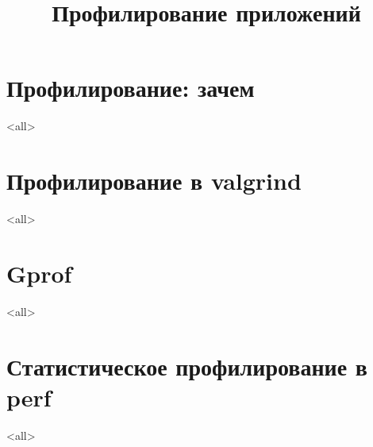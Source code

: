 

\title[Profiling]{Профилирование приложений}





\begin{frame}
	\frametitle{}
	\titlepage
	\vspace{-0.5cm}
	\begin{center}
	\end{center}
\end{frame}

\begin{frame}
	\tableofcontents
\end{frame}




\section{Профилирование: зачем}
\mode<all>{}

\section{Профилирование в valgrind}
\mode<all>{}

\section{Gprof}
\mode<all>{}

\section[oprofile]{Статистическое профилирование в perf}
\mode<all>{}


